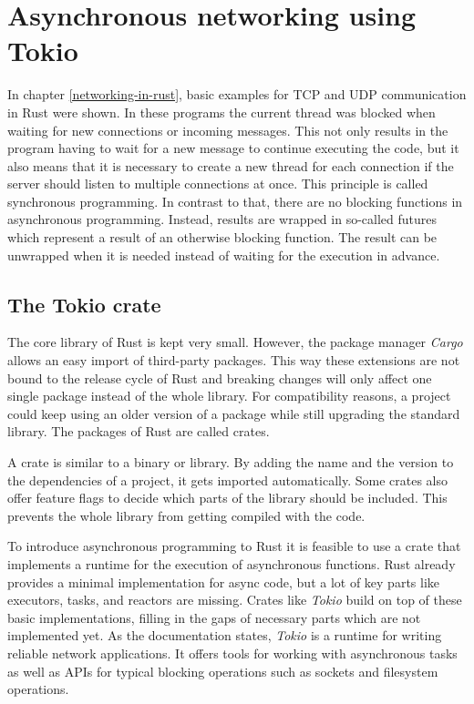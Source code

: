 
\section{Asynchronous networking using Tokio} \label{asynchronous-networking}
In chapter \ref{networking-in-rust}, basic examples for TCP and UDP communication in Rust were shown. In these programs
the current thread was blocked when waiting for new connections or incoming messages. This not only results in the
program having to wait for a new message to continue executing the code, but it also means that it is necessary to
create a new thread for each connection if the server should listen to multiple connections at once. This principle is
called synchronous programming. In contrast to that, there are no blocking functions in asynchronous programming.
Instead, results are wrapped in so-called futures which represent a result of an otherwise blocking function. The
result can be unwrapped when it is needed instead of waiting for the execution in advance. \cite{async-rust}

\subsection{The Tokio crate}
The core library of Rust is kept very small. However, the package manager \textit{Cargo} allows an easy import of
third-party packages. This way these extensions are not bound to the release cycle of Rust and breaking changes will
only affect one single package instead of the whole library. For compatibility reasons, a project could keep using an
older version of a package while still upgrading the standard library. The packages of Rust are called crates.

A crate is similar to a binary or library. By adding the name and the version to the dependencies of a project, it gets
imported automatically. Some crates also offer feature flags to decide which parts of the library should be included.
This prevents the whole library from getting compiled with the code.

To introduce asynchronous programming to Rust it is feasible to use a crate that implements a runtime for the
execution of asynchronous functions. Rust already provides a minimal implementation for async code, but a lot of
key parts like executors, tasks, and reactors are missing. Crates like \textit{Tokio} build on top of these basic
implementations, filling in the gaps of necessary parts which are not implemented yet. As the documentation
\cite{tokio-doc} states, \textit{Tokio} is a runtime for writing reliable network applications. It offers tools for
working with asynchronous tasks as well as APIs for typical blocking operations such as sockets and filesystem
operations.

